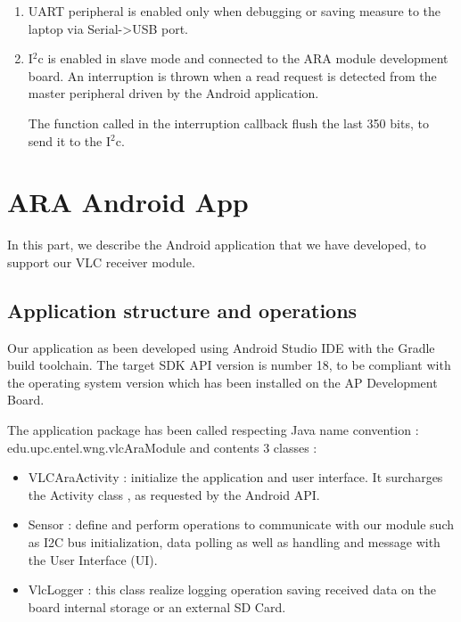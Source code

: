 \begin{enumerate}
\item UART peripheral is enabled only when debugging or saving measure to the laptop via Serial->USB port.

\item I$^2$c is enabled in slave mode and connected to the ARA module development board. An interruption is thrown when a read request is detected from the master peripheral driven by the Android application.

The function called in the interruption callback flush the last 350 bits, to send it to the I$^2$c.


\end{enumerate}


\section{ARA Android App}

In this part, we describe the Android application that we have developed, to support our VLC receiver module.

\subsection{Application structure and operations}
Our application as been developed using Android Studio IDE \citep{android} with the Gradle build toolchain. The target SDK API version is number 18, to be compliant with the operating system version which has been installed on the AP Development Board.

The application package has been called respecting Java name convention : edu.upc.entel.wng.vlcAraModule and contents 3 classes :

\begin{itemize}
\item VLCAraActivity : initialize the application and user interface. It surcharges the Activity class , as requested by the Android API.
\item Sensor : define and perform operations to communicate with our module such as I2C bus initialization, data polling as well as handling and message with the User Interface (UI).
\item VlcLogger : this class realize logging operation saving received data on the board internal storage or an external SD Card.
\end{itemize}

